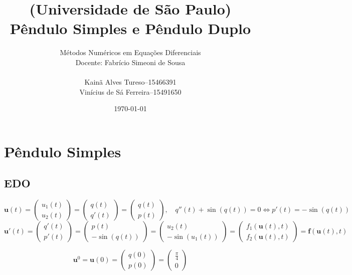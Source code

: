 \documentclass{article}
\title{(Universidade de São Paulo)\\
Pêndulo Simples e Pêndulo Duplo}
\author{Métodos Numéricos em Equações Diferenciais\\
Docente: Fabrício Simeoni de Sousa\\[.2cm]
\begin{tabular}{r@{\ }c@{\ }l}
    Kainã Alves Tureso      &-- &15466391\\
    Vinícius de Sá Ferreira &-- &15491650
\end{tabular}}
\date{\today}
\newcommand{\bd}[1]{\mathbf{#1}} %
\begin{document}
    \maketitle

    \section{Pêndulo Simples}
    \subsection{EDO}
    \[\bd{u}(t) = \begin{pmatrix}
        u_1(t)\\
        u_2(t)
    \end{pmatrix} = \begin{pmatrix}
        q(t)\\
        q'(t)
    \end{pmatrix} = \begin{pmatrix}
        q(t)\\
        p(t)
    \end{pmatrix},\quad q''(t) + \sin(q(t)) = 0 \iff p'(t) = -\sin(q(t))\]
    \[\bd{u}'(t) = \begin{pmatrix}
        q'(t)\\
        p'(t)
    \end{pmatrix} = \begin{pmatrix}
        p(t)\\
        -\sin(q(t))
    \end{pmatrix} = \begin{pmatrix}
        u_2(t)\\
        -\sin(u_1(t))
    \end{pmatrix} = \begin{pmatrix}
        f_1(\bd{u}(t), t)\\
        f_2(\bd{u}(t), t)
    \end{pmatrix} = \bd{f}(\bd{u}(t), t)\]

    \[\bd{u}^0 = \bd{u}(0) = \begin{pmatrix}
        q(0)\\
        p(0)
    \end{pmatrix} = \begin{pmatrix}
        \frac{\pi}{4}\\
        0
    \end{pmatrix}\]
\end{document}
